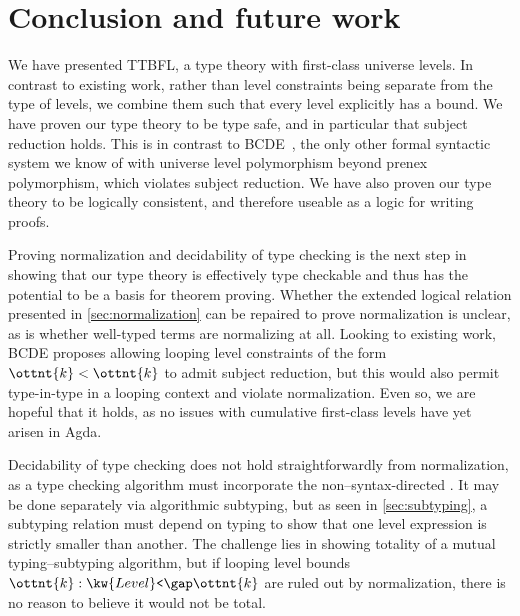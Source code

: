 \documentclass[a4paper,UKenglish,cleveref,autoref,thm-restate]{lipics-v2021}
\makeatletter
\newcommand{\citep}[1]{\cite{#1}}
\newcommand{\lang}{TTBFL\@\xspace}
\makeatother
\begin{document}
\section{Conclusion and future work} \label{sec:conclusion}

We have presented \lang, a type theory with first-class universe levels.
In contrast to existing work,
rather than level constraints being separate from the type of levels,
we combine them such that every level explicitly has a bound.
We have proven our type theory to be type safe,
and in particular that subject reduction holds.
This is in contrast to BCDE~\citep{univ-poly},
the only other formal syntactic system we know of
with universe level polymorphism beyond prenex polymorphism,
which violates subject reduction.
We have also proven our type theory to be logically consistent,
and therefore useable as a logic for writing proofs.

Proving normalization and decidability of type checking
is the next step in showing that our type theory is effectively type checkable
and thus has the potential to be a basis for theorem proving.
Whether the extended logical relation presented in \cref{sec:normalization}
can be repaired to prove normalization is unclear,
as is whether well-typed terms are normalizing at all.
Looking to existing work,
BCDE proposes allowing looping level constraints of the form $\ottnt{k} < \ottnt{k}$ to admit subject reduction,
but this would also permit type-in-type in a looping context and violate normalization.
Even so, we are hopeful that it holds,
as no issues with cumulative first-class levels have yet arisen in Agda.

Decidability of type checking does not hold straightforwardly from normalization,
as a type checking algorithm must incorporate the non--syntax-directed .
It may be done separately via algorithmic subtyping,
but as seen in \cref{sec:subtyping},
a subtyping relation must depend on typing
to show that one level expression is strictly smaller than another.
The challenge lies in showing totality of a mutual typing--subtyping algorithm,
but if looping level bounds $\ottnt{k} :  \kw{Level}\texttt{<} \gap  \ottnt{k} $ are ruled out by normalization,
there is no reason to believe it would not be total.



\end{document}

